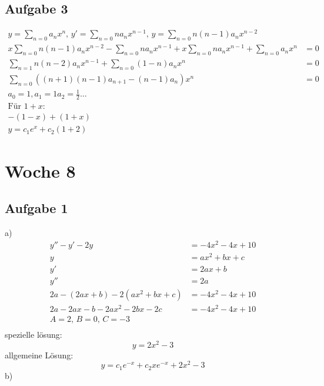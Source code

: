 \documentclass{article}
\begin{document}
\subsection*{Aufgabe 3}
\begin{align*}
    y = \sum_{n=0} a_nx^n,\,y' = \sum_{n=0} na_nx^{n-1},\,y = \sum_{n=0} n(n-1)a_nx^{n-2}\\
    x \sum_{n=0} n(n-1)a_nx^{n-2} - \sum_{n=0} na_nx^{n-1} + x \sum_{n=0} na_nx^{n-1}+\sum_{n=0} a_nx^n &= 0\\
    \sum_{n=1} n(n-2)a_nx^{n-1}+\sum_{n=0} (1-n) a_nx^n &=0\\
    \sum_{n=0} ((n+1)(n-1)a_{n+1}-(n-1)a_n)x^n &=0\\
    a_0 = 1, a_1 = 1 a_2 = \frac{1}{2}\dots\\
    \text{Für }1+x:\\
    -(1-x)+(1+x)\\
    y=c_1e^x+c_2(1+2)
\end{align*}

\section*{Woche 8}
\subsection*{Aufgabe 1}
a)
\begin{align*}
    y'' - y' - 2y &= -4x^2-4x+10\\
    y&= ax^2 + bx + c\\
    y'&=2ax + b\\
    y'' &= 2a\\
    2a-(2ax+b)-2(ax^2+bx+c)&=-4x^2-4x+10\\
    2a-2ax-b-2ax^2-2bx-2c &= -4x^2-4x+10\\
    A = 2,\, B = 0,\,C=-3\\
\end{align*}
spezielle lösung:
\begin{equation*}
    y=2x^2-3
\end{equation*}
allgemeine Lösung:
\begin{equation*}
    y=c_1e^{-x}+c_2xe^{-x}+2x^2-3
\end{equation*}
b)
\end{document}
